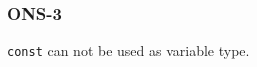 \subsubsection{ONS-3}\label{sec:error_code_ons_3}

\texttt{const} can not be used as variable type.


